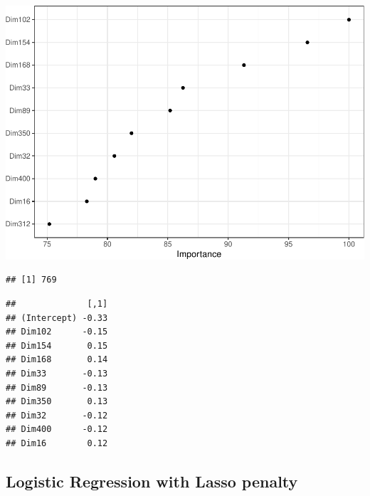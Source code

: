 \documentclass[
  english,
  man]{apa6}
\begin{document}
\includegraphics{analysis_files/figure-latex/unnamed-chunk-11-2.pdf}

\begin{verbatim}
## [1] 769
\end{verbatim}

\begin{verbatim}
##              [,1]
## (Intercept) -0.33
## Dim102      -0.15
## Dim154       0.15
## Dim168       0.14
## Dim33       -0.13
## Dim89       -0.13
## Dim350       0.13
## Dim32       -0.12
## Dim400      -0.12
## Dim16        0.12
\end{verbatim}

\hypertarget{logistic-regression-with-lasso-penalty}{%
\subsection{Logistic Regression with Lasso penalty}\label{logistic-regression-with-lasso-penalty}}
\end{document}
